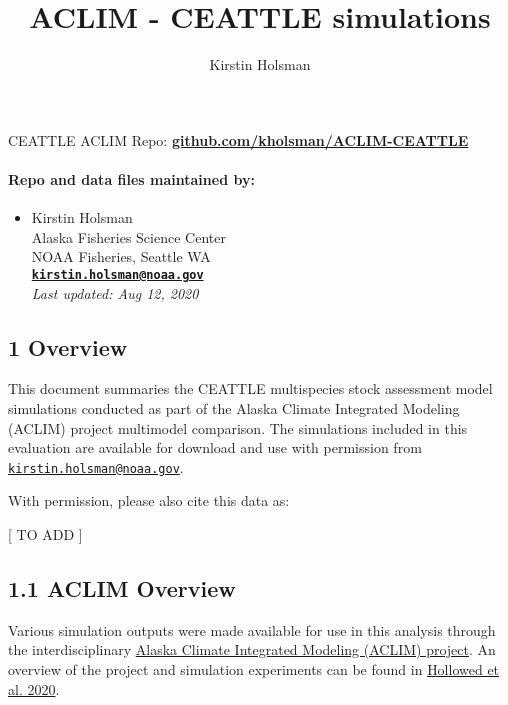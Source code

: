 \documentclass[]{article}
\title{ACLIM - CEATTLE simulations}
\author{Kirstin Holsman}
\date{}
\providecommand{\tightlist}{%
  \setlength{\itemsep}{0pt}\setlength{\parskip}{0pt}}
\let\oldparagraph\paragraph
\renewcommand{\paragraph}[1]{\oldparagraph{#1}\mbox{}}
\begin{document}
\maketitle

CEATTLE ACLIM Repo:
\href{https://github.com/kholsman/ACLIM-CEATTLE}{\textbf{github.com/kholsman/ACLIM-CEATTLE}}

\paragraph{Repo and data files maintained
by:}\label{repo-and-data-files-maintained-by}

\begin{itemize}
\tightlist
\item
  Kirstin Holsman\\
  Alaska Fisheries Science Center\\
  NOAA Fisheries, Seattle WA\\
  \textbf{\href{mailto:kirstin.holsman@noaa.gov}{\nolinkurl{kirstin.holsman@noaa.gov}}}\\
  \emph{Last updated: Aug 12, 2020}
\end{itemize}

\subsection{1 Overview}\label{overview}

This document summaries the CEATTLE multispecies stock assessment model
simulations conducted as part of the Alaska Climate Integrated Modeling
(ACLIM) project multimodel comparison. The simulations included in this
evaluation are available for download and use with permission from
\href{mailto:kirstin.holsman@noaa.gov}{\nolinkurl{kirstin.holsman@noaa.gov}}.

With permission, please also cite this data as:

{[} TO ADD {]}

\subsection{1.1 ACLIM Overview}\label{aclim-overview}

Various simulation outputs were made available for use in this analysis
through the interdisciplinary
\href{\%22https://www.fisheries.noaa.gov/alaska/ecosystems/alaska-climate-integrated-modeling-project\%22}{Alaska
Climate Integrated Modeling (ACLIM) project}. An overview of the project
and simulation experiments can be found in
\href{\%22https://www.frontiersin.org/articles/10.3389/fmars.2019.00775/full\%22}{Hollowed
et al. 2020}.
\end{document}

